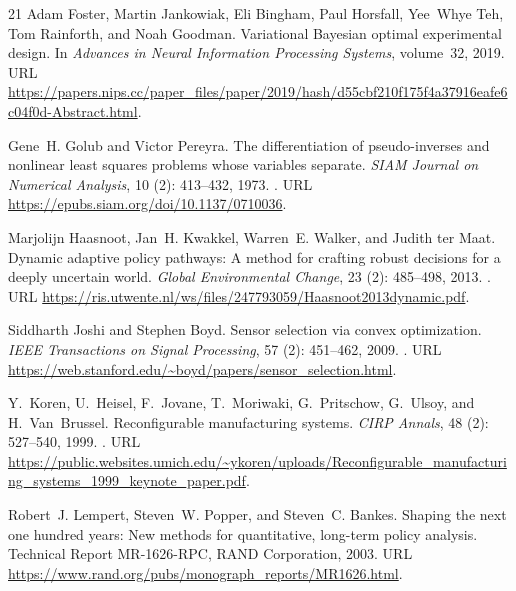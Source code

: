 \documentclass[11pt,letterpaper]{article}
\begin{document}
\begin{thebibliography}{21}
Adam Foster, Martin Jankowiak, Eli Bingham, Paul Horsfall, Yee~Whye Teh, Tom
  Rainforth, and Noah Goodman.
\newblock Variational {Bayesian} optimal experimental design.
\newblock In \emph{Advances in Neural Information Processing Systems},
  volume~32, 2019.
\newblock URL
  \url{https://papers.nips.cc/paper_files/paper/2019/hash/d55cbf210f175f4a37916eafe6c04f0d-Abstract.html}.

Gene~H. Golub and Victor Pereyra.
\newblock The differentiation of pseudo-inverses and nonlinear least squares
  problems whose variables separate.
\newblock \emph{SIAM Journal on Numerical Analysis}, 10 (2):
  413--432, 1973.
\newblock {}.
\newblock URL \url{https://epubs.siam.org/doi/10.1137/0710036}.

Marjolijn Haasnoot, Jan~H. Kwakkel, Warren~E. Walker, and Judith ter Maat.
\newblock Dynamic adaptive policy pathways: A method for crafting robust
  decisions for a deeply uncertain world.
\newblock \emph{Global Environmental Change}, 23 (2):
  485--498, 2013.
\newblock {}.
\newblock URL
  \url{https://ris.utwente.nl/ws/files/247793059/Haasnoot2013dynamic.pdf}.

Siddharth Joshi and Stephen Boyd.
\newblock Sensor selection via convex optimization.
\newblock \emph{IEEE Transactions on Signal Processing}, 57
  (2): 451--462, 2009.
\newblock {}.
\newblock URL
  \url{https://web.stanford.edu/~boyd/papers/sensor_selection.html}.

Y.~Koren, U.~Heisel, F.~Jovane, T.~Moriwaki, G.~Pritschow, G.~Ulsoy, and
  H.~Van~Brussel.
\newblock Reconfigurable manufacturing systems.
\newblock \emph{CIRP Annals}, 48 (2): 527--540, 1999.
\newblock {}.
\newblock URL
  \url{https://public.websites.umich.edu/~ykoren/uploads/Reconfigurable_manufacturing_systems_1999_keynote_paper.pdf}.

Robert~J. Lempert, Steven~W. Popper, and Steven~C. Bankes.
\newblock Shaping the next one hundred years: New methods for quantitative,
  long-term policy analysis.
\newblock Technical Report MR-1626-RPC, RAND Corporation, 2003.
\newblock URL \url{https://www.rand.org/pubs/monograph_reports/MR1626.html}.


\end{thebibliography}
\end{document}

